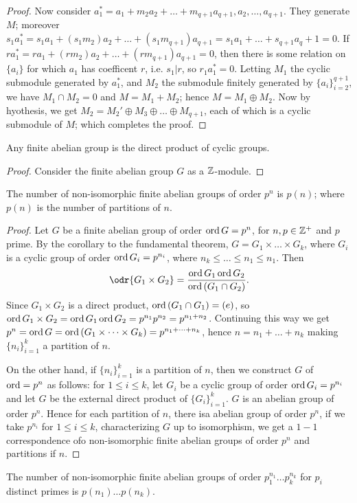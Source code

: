 \begin{proof}
    Now consider $a_1^*=a_1+m_2a_2+\dots+m_{q+1}a_{q+1},a_2, \dots, a_{q+1}$. They generate $M$;
    moreover  $s_1a_1^*=s_1a_1+(s_1m_2)a_2+\dots+(s_1m_{q+1})a_{q+1}=s_1a_1+\dots+s_{q+1}a_q+1=0$.
    If $ra_1^*=ra_1+(rm_2)a_2+\dots+(rm_{q+1})a_{q+1}=0$, then there is some relation on $\{a_i\}$
    for which $a_1$ has coefficent $r$, i.e.  $s_1|r$, so $r_1a_1^*=0$. Letting $M_1$ the cyclic
    submodule generated by $a_1^*$, and $M_2$ the submodule finitely generated by
    $\{a_i\}_{i=2}^{q+1}$, we have $M_1 \cap M_2=0$ and $M=M_1+M_2$; hence $M=M_1 \oplus M_2$. Now
    by hyothesis, we get $M_2=M_2' \oplus M_3 \oplus \dots \oplus M_{q+1}$, each of which is a
    cyclic submodule of $M$; which completes the proof.
\end{proof}
\begin{corollary}
    Any finite abelian group is the direct product of cyclic groups.
\end{corollary}
\begin{proof}
    Consider the finite abelian group $G$ as a  $\mathbb{Z}$-module.
\end{proof}

\begin{theorem}\label{1.5.2} 
    The number of non-isomorphic finite abelian groups of order $p^n$ is  $p(n)$; where $p(n)$ is the
    number of partitions of $n$.
\end{theorem}
\begin{proof}
    Let $G$ be a finite abelian group of order $\operatorname{ord}{G}=p^n$, for $n,p \in \mathbb{Z}^+$ and  $p$ prime. By
    the corollary to the fundamental theorem,  $G=G_1 \times \dots \times G_k$, where $G_i$ is a
    cyclic group of order  $\operatorname{ord}{G_i}=p^{n_i}$, where $n_k \leq \dots \leq n_1 \leq n_1$. Then
        \begin{equation*}
            \odr{G_1 \times G_2}=\frac{\ord{G_1}\ord{G_2}}{\ord{(G_1 \cap G_2)}}.
        \end{equation*}
        Since $G_1 \times G_2$ is a direct product, $\operatorname{ord}{(G_1 \cap G_1)}=(e)$, so $\operatorname{ord}{G_1 \times
        G_2}=\operatorname{ord}{G_1}\operatorname{ord}{G_2}=p^{n_1}p^{n_2}=p^{n_1+n_2}$. Continuing this way we get
        $p^n=\operatorname{ord}{G}=\operatorname{ord}{(G_1 \times \dots \times G_k)}=p^{n_1+\dots+n_k}$, hence $n=n_1+\dots+n_k$
        making $\{n_i\}_{i=1}^k$ a partition of $n$.

        On the other hand, if $\{n_i\}_{i=1}^k$ is a partition of $n$, then we construct  $G$ of
        $\operatorname{ord}=p^n$ as follows: for  $1 \leq i \leq k$, let  $G_i$ be a cyclic group of order
        $\operatorname{ord}{G_i}=p^{n_i}$ and let $G$ be the external direct product of  $\{G_i\}_{i=1}^k$. $G$ is
        an abelian group of order  $p^n$. Hence for each partition of  $n$, there isa abelian group
        of order  $p^n$, if we take  $p^{n_i}$ for $1 \leq i \leq k$, characterizing  $G$ up to
        isomorphism, we get a  $1-1$ correspondence ofo non-isomorphic finite abelian groups of
        order  $p^n$ and partitions if  $n$.
\end{proof}
\begin{corollary}
    The number of non-isomorphic finite abelian groups of order $p_1^{n_1} \dots p_k^{n_k}$ for
    $p_i$ distinct primes is  $p(n_1) \dots p(n_k)$.
\end{corollary}

